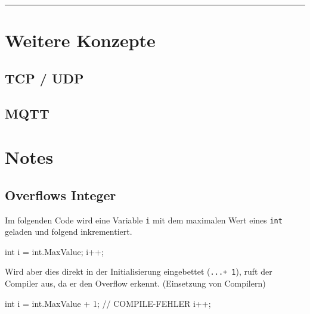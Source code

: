 \documentclass[
  10pt,
  a4paperpaper,
  DIV=11]{scrartcl}
\newenvironment{Shaded}{}{}
\newcommand{\CommentTok}[1]{\textcolor[rgb]{0.42,0.45,0.49}{#1}}
\newcommand{\DataTypeTok}[1]{\textcolor[rgb]{0.84,0.23,0.29}{#1}}
\newcommand{\DecValTok}[1]{\textcolor[rgb]{0.00,0.36,0.77}{#1}}
\newcommand{\FunctionTok}[1]{\textcolor[rgb]{0.44,0.26,0.76}{#1}}
\newcommand{\NormalTok}[1]{\textcolor[rgb]{0.14,0.16,0.18}{#1}}
\newcommand{\OperatorTok}[1]{\textcolor[rgb]{0.14,0.16,0.18}{#1}}
\numberwithin{equation}{section}
\begin{document}
\begin{center}\rule{0.5\linewidth}{0.5pt}\end{center}

\hypertarget{weitere-konzepte}{%
\section{Weitere Konzepte}\label{weitere-konzepte}}

\hypertarget{tcp-udp}{%
\subsection{TCP / UDP}\label{tcp-udp}}

\hypertarget{mqtt}{%
\subsection{MQTT}\label{mqtt}}

\hypertarget{notes}{%
\section{Notes}\label{notes}}

\hypertarget{overflows-integer}{%
\subsection{Overflows Integer}\label{overflows-integer}}

Im folgenden Code wird eine Variable \texttt{i} mit dem maximalen Wert
eines \texttt{int} geladen und folgend inkrementiert.

\begin{Shaded}
\begin{Highlighting}[]
\DataTypeTok{int}\NormalTok{ i }\OperatorTok{=} \DataTypeTok{int}\OperatorTok{.}\FunctionTok{MaxValue}\OperatorTok{;}
\NormalTok{i}\OperatorTok{++;}
\end{Highlighting}
\end{Shaded}

Wird aber dies direkt in der Initialisierung eingebettet
(\texttt{...+\ 1}), ruft der Compiler aus, da er den Overflow erkennt.
(Einsetzung von Compilern)

\begin{Shaded}
\begin{Highlighting}[]
\DataTypeTok{int}\NormalTok{ i }\OperatorTok{=} \DataTypeTok{int}\OperatorTok{.}\FunctionTok{MaxValue} \OperatorTok{+} \DecValTok{1}\OperatorTok{;} \CommentTok{// COMPILE{-}FEHLER}
\NormalTok{i}\OperatorTok{++;}
\end{Highlighting}
\end{Shaded}
\end{document}
